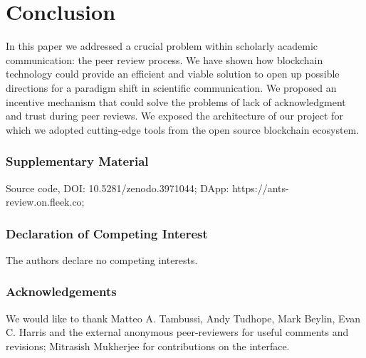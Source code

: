 \documentclass[runningheads]{llncs}
\begin{document}
\section{Conclusion}
In this paper we addressed a crucial problem within scholarly academic communication: the peer review process. We have shown how blockchain technology could provide an efficient and viable solution to open up possible directions for a paradigm shift in scientific communication. We proposed an incentive mechanism that could solve the problems of lack of acknowledgment and trust during peer reviews. We exposed the architecture of our project for which we adopted cutting-edge tools from the open source blockchain ecosystem.


\subsubsection{Supplementary Material}
Source code, DOI: 10.5281/zenodo.3971044; 
\newline DApp: https://ants-review.on.fleek.co;

\small{
\subsubsection{Declaration of Competing Interest}
The authors declare no competing interests.

\subsubsection{Acknowledgements} We would like to thank Matteo A. Tambussi, Andy Tudhope, Mark Beylin, Evan C. Harris and the external anonymous peer-reviewers for useful comments and revisions; Mitrasish Mukherjee for contributions on the interface.}


%
%


\end{document}
